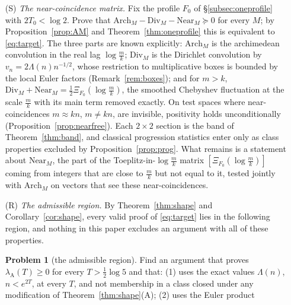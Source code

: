 \documentclass[11pt]{amsart}
\theoremstyle{definition}
\newtheorem{problem}[theorem]{Problem}
\theoremstyle{remark}
\newcommand{\PT}{\mathcal P_T}
\newcommand{\lamA}{\lambda_{\mathrm A}(T)}
\begin{document}
\begin{enumerate}
weights does; what is needed is cancellation of exponent $\frac12$ in the twisted sum, with sign, at about
$e^{2T}$ frequencies. A first case is the inequality $(E_\gamma)$ of Proposition~\ref{prop:wit-Egamma} for one fixed
$\gamma$, which is necessary for \eqref{eq:target}. In polar-free form (Proposition~\ref{prop:sharp}) the problem is the
inequality $\mathcal F_T\le\mathfrak a^\sharp$ on $\PT$, whose archimedean side has bottom $\lambda^\sharp(T)\downarrow C_0+4$; for the
packets the threshold is exactly $m^\sharp(\gamma)$ (Proposition~\ref{prop:Egamma-exact}).
\item[(S)] \emph{The near-coincidence matrix.} Fix the profile $F_0$ of \S\ref{subsec:oneprofile} with $2T_0<\log2$. Prove that
$\mathrm{Arch}_M-\mathrm{Div}_M-\mathrm{Near}_M\succeq0$ for every $M$; by Proposition~\ref{prop:AM} and Theorem~\ref{thm:oneprofile}
this is equivalent to \eqref{eq:target}. The three parts are known explicitly: $\mathrm{Arch}_M$ is the archimedean convolution
in the real lag $\log\frac mk$; $\mathrm{Div}_M$ is the Dirichlet convolution by $v_n=2\Lambda(n)n^{-1/2}$, whose restriction to
multiplicative boxes is bounded by the local Euler factors (Remark~\ref{rem:boxes}); and for $m>k$,
$\mathrm{Div}_M+\mathrm{Near}_M=\frac12\Xi_{F_0}(\log\frac mk)$, the smoothed Chebyshev fluctuation at the scale $\frac mk$ with its
main term removed exactly. On test spaces where near-coincidences $m\approx kn$, $m\ne kn$, are invisible, positivity holds
unconditionally (Proposition~\ref{prop:nearfree}). Each $2\times2$ section is the band of Theorem~\ref{thm:band}, and classical
progression statistics enter only as class properties excluded by Proposition~\ref{prop:prog}. What remains is a statement about
$\mathrm{Near}_M$, the part of the Toeplitz-in-$\log\frac mk$ matrix $[\Xi_{F_0}(\log\frac mk)]$ coming from integers that are close
to $\frac mk$ but not equal to it, tested jointly with $\mathrm{Arch}_M$ on vectors that see these near-coincidences.
\item[(R)] \emph{The admissible region.} By Theorem~\ref{thm:shape} and Corollary~\ref{cor:shape}, every valid proof of
\eqref{eq:target} lies in the following region, and nothing in this paper excludes an argument with all of these properties.
\begin{problem}[the admissible region]\label{prob:region}
Find an argument that proves $\lamA\ge0$ for every $T>\frac12\log5$ and that: (1) uses the exact values $\Lambda(n)$, $n<e^{2T}$,
at every $T$, and not membership in a class closed under any modification of Theorem~\ref{thm:shape}(A); (2) uses the Euler product

\end{problem}
\end{enumerate}
\end{document}
